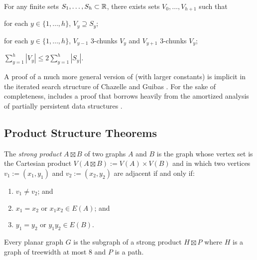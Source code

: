 \documentclass[kpfonts]{patmorin}
\let\le\leqslant
\begin{document}
\begin{lem}
  For any finite sets $S_1,\ldots,S_h\subset\mathbb{R}$, there exists sets $V_0,\ldots,V_{h+1}$ such that
  \begin{compactenum}
    \item for each $y\in\{1,\ldots,h\}$, $V_y\supseteq S_y$;
    \item for each $y\in\{1,\ldots,h\}$, $V_{y-1}$ 3-chunks $V_y$ and $V_{y+1}$ 3-chunks $V_y$;
    \item $\sum_{y=1}^h |V_y|\le 2\sum_{y=1}^h |S_y|$.
  \end{compactenum}
\end{lem}

A proof of a much more general version of  (with larger constants) is implicit in the iterated search structure of Chazelle and Guibas \cite{chazelle.guibas:fractional1}.   For the sake of completeness,  includes a proof that borrows heavily from the amortized analysis of partially persistent data structures \cite[Section~2.3]{driscoll.sarnak.ea:making}.


\subsection{Product Structure Theorems}

The \emph{strong product} $A\boxtimes B$ of two graphs $A$ and $B$ is the graph whose vertex set is the Cartesian product $V(A\boxtimes B):=V(A)\times V(B)$ and in which two vertices $v_1:=(x_1,y_1)$ and $v_2:=(x_2,y_2)$ are adjacent if and only if:
\begin{enumerate}
  \item  $v_1\neq v_2$; and
  \item $x_1=x_2$ or $x_1x_2\in E(A)$; and
  \item $y_1=y_2$ or $y_1y_2\in E(B)$.
\end{enumerate}

\begin{thm}
  Every planar graph $G$ is the subgraph of a strong product $H\boxtimes P$ where $H$ is a graph of treewidth at most 8 and $P$ is a path.
\end{thm}
\end{document}
